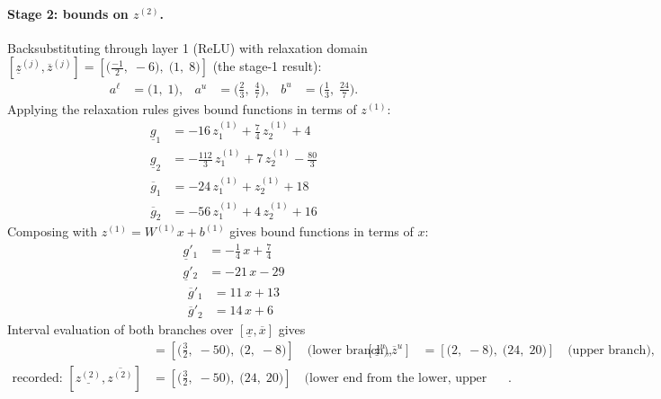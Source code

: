 \documentclass[11pt]{article}
\begin{document}
\paragraph{Stage 2: bounds on $z^{(2)}$.}
Backsubstituting through layer 1 (ReLU) with relaxation domain $[\underline{z}^{(j)}, \overline{z}^{(j)}] = [\bigl(\frac{-1}{2},\; -6\bigr),\; \bigl(1,\; 8\bigr)]$ (the stage-1 result):
\begin{align*}
a^{\ell} &= \bigl(1,\; 1\bigr), & a^{u} &= \bigl(\frac{2}{3},\; \frac{4}{7}\bigr), & b^{u} &= \bigl(\frac{1}{3},\; \frac{24}{7}\bigr).
\end{align*}
Applying the relaxation rules gives bound functions in terms of $z^{(1)}$:
\begin{align*}
\underline{g}_{1} &= -16\,z^{(1)}_{1} + \frac{7}{4}\,z^{(1)}_{2} + 4 \\
\underline{g}_{2} &= -\frac{112}{3}\,z^{(1)}_{1} + 7\,z^{(1)}_{2} - \frac{80}{3}
\end{align*}
\begin{align*}
\overline{g}_{1} &= -24\,z^{(1)}_{1} + z^{(1)}_{2} + 18 \\
\overline{g}_{2} &= -56\,z^{(1)}_{1} + 4\,z^{(1)}_{2} + 16
\end{align*}
Composing with $z^{(1)} = W^{(1)} x + b^{(1)}$ gives bound functions in terms of $x$:
\begin{align*}
\underline{g}'_{1} &= -\frac{1}{4}\,x + \frac{7}{4} \\
\underline{g}'_{2} &= -21\,x - 29
\end{align*}
\begin{align*}
\overline{g}'_{1} &= 11\,x + 13 \\
\overline{g}'_{2} &= 14\,x + 6
\end{align*}
Interval evaluation of both branches over $[\underline{x}, \overline{x}]$ gives
\begin{align*}
[\underline{z}^{\ell}, \overline{z}^{\ell}] &= [\bigl(\frac{3}{2},\; -50\bigr),\; \bigl(2,\; -8\bigr)] \quad\text{(lower branch)}, & [\underline{z}^{u}, \overline{z}^{u}] &= [\bigl(2,\; -8\bigr),\; \bigl(24,\; 20\bigr)] \quad\text{(upper branch)}, \\
\text{recorded: } [\underline{z^{(2)}}, \overline{z^{(2)}}] &= [\bigl(\frac{3}{2},\; -50\bigr),\; \bigl(24,\; 20\bigr)] \quad\text{(lower end from the lower, upper end from the upper branch)}.
\end{align*}
\end{document}
